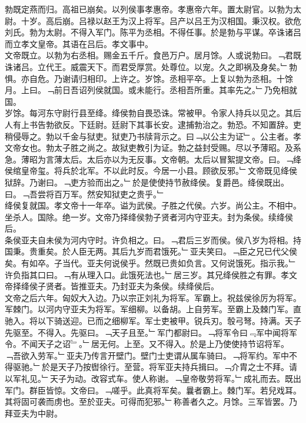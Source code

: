 \documentclass{zhvt-classic}
\begin{document}
\hspace*{2em}勃既定燕而归。高祖已崩矣。以列侯事孝惠帝。孝惠帝六年。置太尉官。以勃为太尉。十岁。高后崩。吕禄以赵王为汉上将军。吕产以吕王为汉相国。秉汉权。欲危刘氏。勃为太尉。不得入军门。陈平为丞相。不得任事。於是勃与平谋。卒诛诸吕而立孝文皇帝。其语在吕后。孝文事中。\\
\hspace*{2em}文帝既立。以勃为右丞相。赐金五千斤。食邑万户。居月馀。人或说勃曰。﹁君既诛诸吕。立代王。威震天下。而君受厚赏。处尊位。以宠。久之即祸及身矣。﹂勃惧。亦自危。乃谢请归相印。上许之。岁馀。丞相平卒。上复以勃为丞相。十馀月。上曰。﹁前日吾诏列侯就国。或未能行。丞相吾所重。其率先之。﹂乃免相就国。\\
\hspace*{2em}岁馀。每河东守尉行县至绛。绛侯勃自畏恐诛。常被甲。令家人持兵以见之。其后人有上书告勃欲反。下廷尉。廷尉下其事长安。逮捕勃治之。勃恐。不知置辞。吏稍侵辱之。勃以千金与狱吏。狱吏乃书牍背示之。曰﹁以公主为证﹂。公主者。孝文帝女也。勃太子胜之尚之。故狱吏教引为证。勃之益封受赐。尽以予薄昭。及系急。薄昭为言薄太后。太后亦以为无反事。文帝朝。太后以冒絮提文帝。曰。﹁绛侯绾皇帝玺。将兵於北军。不以此时反。今居一小县。顾欲反邪。﹂文帝既见绛侯狱辞。乃谢曰。﹁吏方验而出之。﹂於是使使持节赦绛侯。复爵邑。绛侯既出。曰。﹁吾尝将百万军。然安知狱吏之贵乎。﹂\\
\hspace*{2em}绛侯复就国。孝文帝十一年卒。谥为武侯。子胜之代侯。六岁。尚公主。不相中。坐杀人。国除。绝一岁。文帝乃择绛侯勃子贤者河内守亚夫。封为条侯。续绛侯后。\\
\hspace*{2em}条侯亚夫自未侯为河内守时。许负相之。曰。﹁君后三岁而侯。侯八岁为将相。持国秉。贵重矣。於人臣无两。其后九岁而君饿死。﹂亚夫笑曰。﹁臣之兄已代父侯矣。有如卒。子当代。亚夫何说侯乎。然既已贵如负言。又何说饿死。指示我。﹂许负指其口曰。﹁有从理入口。此饿死法也。﹂居三岁。其兄绛侯胜之有罪。孝文帝择绛侯子贤者。皆推亚夫。乃封亚夫为条侯。续绛侯后。\\
\hspace*{2em}文帝之后六年。匈奴大入边。乃以宗正刘礼为将军。军霸上。祝兹侯徐厉为将军。军棘门。以河内守亚夫为将军。军细柳。以备胡。上自劳军。至霸上及棘门军。直驰入。将以下骑送迎。已而之细柳军。军士吏被甲。锐兵刃。彀弓弩。持满。天子先驱至。不得入。先驱曰。﹁天子且至。﹂军门都尉曰。﹁将军令曰﹃军中闻将军令。不闻天子之诏﹄。﹂居无何。上至。又不得入。於是上乃使使持节诏将军。﹁吾欲入劳军。﹂亚夫乃传言开壁门。壁门士吏谓从属车骑曰。﹁将军约。军中不得驱驰。﹂於是天子乃按辔徐行。至营。将军亚夫持兵揖曰。﹁介胄之士不拜。请以军礼见。﹂天子为动。改容式车。使人称谢。﹁皇帝敬劳将军。﹂成礼而去。既出军门。群臣皆惊。文帝曰。﹁嗟乎。此真将军矣。曩者霸上。棘门军。若兒戏耳。其将固可袭而虏也。至於亚夫。可得而犯邪。﹂称善者久之。月馀。三军皆罢。乃拜亚夫为中尉。\\
\end{document}
